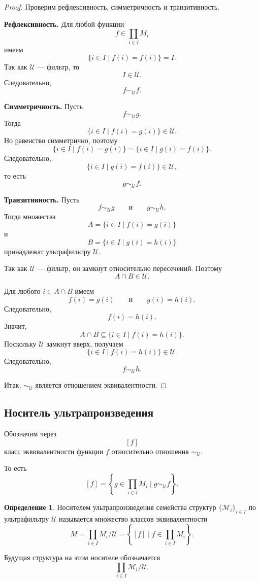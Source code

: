 \documentclass[12pt,a4paper,oneside,openany]{book}
\theoremstyle{definition}
\newtheorem{definition}{Определение}[chapter]
\theoremstyle{plain}
\theoremstyle{remark}
\begin{document}
\begin{proof}
Проверим рефлексивность, симметричность и транзитивность.

\textbf{Рефлексивность.}
Для любой функции
\[
f\in\prod_{i\in I}M_i
\]
имеем
\[
\{i\in I\mid f(i)=f(i)\}=I.
\]
Так как $\mathcal U$ — фильтр, то
\[
I\in\mathcal U.
\]
Следовательно,
\[
f\sim_{\mathcal U} f.
\]

\textbf{Симметричность.}
Пусть
\[
f\sim_{\mathcal U} g.
\]
Тогда
\[
\{i\in I\mid f(i)=g(i)\}\in\mathcal U.
\]
Но равенство симметрично, поэтому
\[
\{i\in I\mid f(i)=g(i)\}
=
\{i\in I\mid g(i)=f(i)\}.
\]
Следовательно,
\[
\{i\in I\mid g(i)=f(i)\}\in\mathcal U,
\]
то есть
\[
g\sim_{\mathcal U} f.
\]

\textbf{Транзитивность.}
Пусть
\[
f\sim_{\mathcal U} g
\qquad
\text{и}
\qquad
g\sim_{\mathcal U} h.
\]
Тогда множества
\[
A=\{i\in I\mid f(i)=g(i)\}
\]
и
\[
B=\{i\in I\mid g(i)=h(i)\}
\]
принадлежат ультрафильтру $\mathcal U$.

Так как $\mathcal U$ — фильтр, он замкнут относительно пересечений. Поэтому
\[
A\cap B\in\mathcal U.
\]

Для любого $i\in A\cap B$ имеем
\[
f(i)=g(i)
\qquad
\text{и}
\qquad
g(i)=h(i).
\]
Следовательно,
\[
f(i)=h(i).
\]
Значит,
\[
A\cap B\subseteq \{i\in I\mid f(i)=h(i)\}.
\]
Поскольку $\mathcal U$ замкнут вверх, получаем
\[
\{i\in I\mid f(i)=h(i)\}\in\mathcal U.
\]
Следовательно,
\[
f\sim_{\mathcal U} h.
\]

Итак, $\sim_{\mathcal U}$ является отношением эквивалентности.
\end{proof}

\subsection{Носитель ультрапроизведения}

Обозначим через
\[
[f]
\]
класс эквивалентности функции $f$ относительно отношения $\sim_{\mathcal U}$.

То есть
\[
[f]
=
\left\{
g\in\prod_{i\in I}M_i
\mid
g\sim_{\mathcal U} f
\right\}.
\]

\begin{definition}
Носителем ультрапроизведения семейства структур $\{\mathcal M_i\}_{i\in I}$ по ультрафильтру $\mathcal U$ называется множество классов эквивалентности
\[
M
=
\prod_{i\in I}M_i/\mathcal U
=
\left\{[f]\mid f\in\prod_{i\in I}M_i\right\}.
\]
\end{definition}

Будущая структура на этом носителе обозначается
\[
\prod_{i\in I}\mathcal M_i/\mathcal U.
\]
\end{document}
